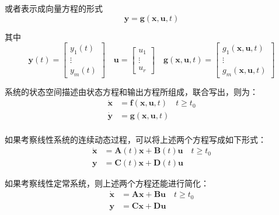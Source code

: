 \begin{definition}[状态方程与输出方程]
    或者表示成向量方程的形式
        \begin{equation*}
        \bm{y} = \bm{g}(\bm{x},\bm{u},t) 
    \end{equation*}

    其中
    \begin{equation*}
        \bm{y}(t) = \left[
            \begin{array}{c}
                y_1(t) \\ \vdots \\ y_m(t) 
            \end{array}
        \right]
        \quad
        \bm{u} = \left[
            \begin{array}{c}
                u_1 \\ \vdots \\ u_r
            \end{array}
        \right]
        \quad 
        \bm{g}(\bm{x},\bm{u},t) = \left[
            \begin{array}{c}
                g_1(\bm{x},\bm{u},t) \\ \vdots \\ g_m(\bm{x},\bm{u},t)
            \end{array}
        \right]
    \end{equation*}
\end{definition}

系统的状态空间描述由状态方程和输出方程所组成，联合写出，则为：
\begin{equation*}
    \begin{aligned}
        \dot{\bm{x}} &= \bm{f}(\bm{x},\bm{u},t) \quad t \geq t_0 \\ 
        \dot{\bm{y}} &= \bm{g}(\bm{x},\bm{u},t)   \\
    \end{aligned}
\end{equation*}

如果考察线性系统的连续动态过程，可以将上述两个方程写成如下形式：
\begin{equation*}
    \begin{aligned}
        \dot{\bm{x}} &= \bm{A}(t) \bm{x} + \bm{B}(t) \bm{u} \quad t \geq t_0 \\
        \bm{y} &= \bm{C}(t) \bm{x} + \bm{D}(t) \bm{u}
    \end{aligned}
\end{equation*}

如果考察线性定常系统，则上述两个方程还能进行简化：
\begin{equation*}
    \begin{aligned}
        \dot{\bm{x}} &= \bm{A} \bm{x} + \bm{B} \bm{u} \quad t \geq t_0 \\
        \bm{y} &= \bm{C} \bm{x} + \bm{D} \bm{u}
    \end{aligned}
\end{equation*}


